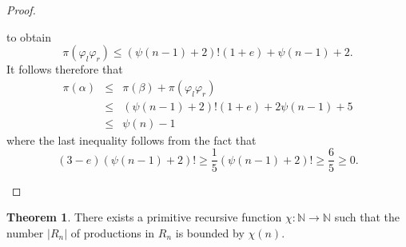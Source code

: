 \documentclass[11pt,a4paper]{amsart}
\theoremstyle{definition}
\newtheorem{theorem}{Theorem}
\newcommand{\potential}[1]{\pi(#1)}
\begin{document}
\begin{proof}
\begin{enumerate}[(i)]
     to obtain \[\potential{\varphi_l \varphi_r} \leq
     (\psi(n-1) + 2)! (1 + e) + \psi(n-1) + 2.\]
     It follows therefore that
     \begin{eqnarray*}
     \potential{\alpha} &\leq& \potential{\beta} + \potential{\varphi_l \varphi_r}\\
     &\leq& (\psi(n-1) + 2)! (1 + e) + 2 \psi(n-1) + 5\\
     &\leq& \psi(n) - 1
     \end{eqnarray*}
     where the last inequality follows from the fact that
     \[ \left( 3 - e \right) (\psi(n-1) + 2)! \geq \frac{1}{5} (\psi(n-1) + 2)! \geq \frac{6}{5} \geq 0. \]
     \end{enumerate}
\end{proof}

\begin{theorem}
 There exists a primitive recursive function $\chi : \mathbb{N} \to \mathbb{N}$
    such that the number $|R_n|$ of productions in $R_n$ is bounded by $\chi(n)$.
\end{theorem}
\end{document}
